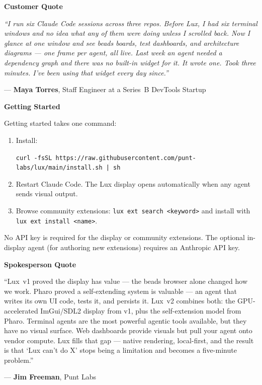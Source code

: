 \documentclass[11pt,letterpaper]{article}
\newcommand{\prsection}[1]{%
  \vspace{1em}%
  {\large\bfseries\color{SectionBlue}#1}%
  \vspace{0.3em}\par%
}
\begin{document}
\prsection{Customer Quote}

\begin{customerquote}
\textit{``I run six Claude Code sessions across three repos.  Before Lux, I
had six terminal windows and no idea what any of them were doing unless I
scrolled back.  Now I glance at one window and see beads boards, test
dashboards, and architecture diagrams --- one frame per agent, all live.
Last week an agent needed a dependency graph and there was no built-in
widget for it.  It wrote one.  Took three minutes.  I've been using that
widget every day since.''}

\raggedleft --- \textbf{Maya Torres}, Staff Engineer at a Series~B DevTools Startup
\end{customerquote}

\prsection{Getting Started}

Getting started takes one command:

\begin{enumerate}[nosep]
  \item Install:

    {\small\texttt{curl -fsSL https://raw.githubusercontent.com/\allowbreak punt-labs/lux/main/install.sh | sh}}
  \item Restart Claude Code.  The Lux display opens automatically when any
    agent sends visual output.
  \item Browse community extensions:
    {\small\texttt{lux ext search <keyword>}} and install with
    {\small\texttt{lux ext install <name>}}.
\end{enumerate}

No API key is required for the display or community extensions.  The
optional in-display agent (for authoring new extensions) requires an
Anthropic API key.

\prsection{Spokesperson Quote}

\begin{spokespersonquote}
``Lux~v1 proved the display has value --- the beads browser alone changed
how we work.  Pharo proved a self-extending system is valuable --- an agent
that writes its own UI code, tests it, and persists it.  Lux~v2 combines
both: the GPU-accelerated ImGui/SDL2 display from v1, plus the
self-extension model from Pharo.  Terminal
agents are the most powerful agentic tools available, but they have no visual
surface.  Web dashboards provide visuals but pull your agent onto vendor
compute.  Lux fills that gap --- native rendering, local-first, and the
result is that `Lux can't do X' stops being a limitation and becomes a
five-minute problem.''

\raggedleft --- \textbf{Jim Freeman}, Punt Labs
\end{spokespersonquote}
\end{document}
